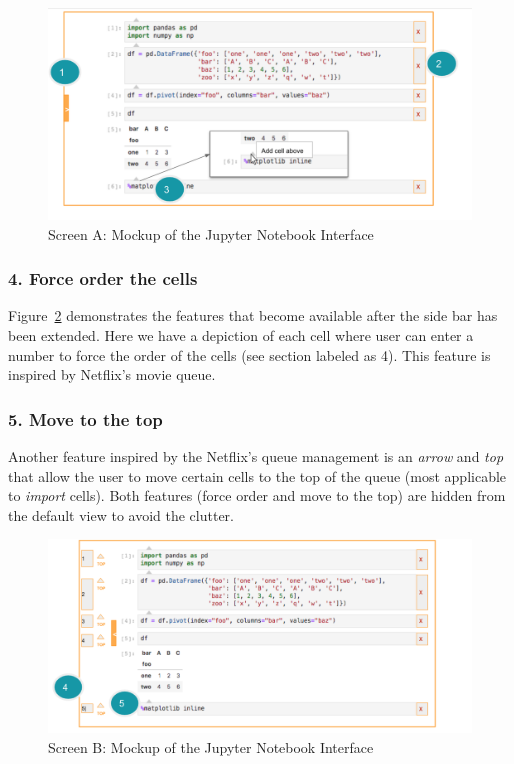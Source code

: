 \documentclass[12pt,letterpaper]{article}
\begin{document}
\begin{figure}[h]
\centering
\includegraphics[scale=.6]{figures/project-principles/jupyter_mock_screen_a.png}
\caption{Screen A: Mockup of the Jupyter Notebook Interface}
\label{fig::4}
\end{figure}

\subsubsection*{4. Force order the cells}
Figure~\ref{fig::5} demonstrates the features that become available after the side bar has been extended. Here we have a depiction of each cell where user can enter a number to force the order of the cells (see section labeled as 4). This feature is inspired by Netflix's movie queue. 

\subsubsection*{5. Move to the top}
Another feature inspired by the Netflix's queue management is an \textit{arrow} and \textit{top} that allow the user to move certain cells to the top of the queue (most applicable to \textit{import} cells). Both features (force order and move to the top) are hidden from the default view to avoid the clutter.

\begin{figure}[h]
\centering
\includegraphics[scale=.6]{figures/project-principles/jupyter_mock_screen_b.png}
\caption{Screen B: Mockup of the Jupyter Notebook Interface}
\label{fig::5}
\end{figure}
\end{document}
